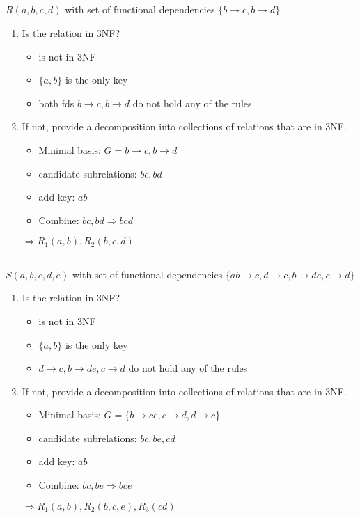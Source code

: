 \documentclass{article}
\begin{document}
\subsection*{} $R(a, b, c, d)$ with set of functional dependencies $\{b \rightarrow c, b \rightarrow d\}$
\begin{enumerate}
    \item Is the relation in 3NF?
        \begin{itemize}
            \item is not in 3NF
            \item $\{a, b\}$ is the only key
            \item both fds ${b \rightarrow c, b \rightarrow d}$ do not hold any of the rules
        \end{itemize}
    \item If not, provide a decomposition into collections of relations that are in 3NF.
        \begin{itemize}
            \item Minimal basis: $G = {b \rightarrow c, b \rightarrow d}$
            \item candidate subrelations: $bc, bd$
            \item add key: $ab$
            \item Combine: $bc, bd \Rightarrow bcd$
        \end{itemize}
    $\Rightarrow R_{1}(a,b), R_{2}(b, c, d)$
\end{enumerate}

\subsection*{} $S(a, b, c, d, e)$ with set of functional dependencies $\{ab \rightarrow c, d \rightarrow c, b \rightarrow de, c \rightarrow d\}$
\begin{enumerate}
    \item Is the relation in 3NF?
    \begin{itemize}
        \item is not in 3NF
        \item $\{a, b\}$ is the only key
        \item ${d \rightarrow c, b \rightarrow de, c \rightarrow d}$ do not hold any of the rules
    \end{itemize}
    \item If not, provide a decomposition into collections of relations that are in 3NF.
        \begin{itemize}
            \item Minimal basis: $G = \{b \rightarrow ce, c \rightarrow d, d \rightarrow c\}$
            \item candidate subrelations: $bc, be, cd$
            \item add key: $ab$ 
            \item Combine: $bc, be \Rightarrow bce$
        \end{itemize}
    $\Rightarrow R_{1}(a,b), R_{2}(b, c, e), R_{3}(cd)$
\end{enumerate}
\end{document}
